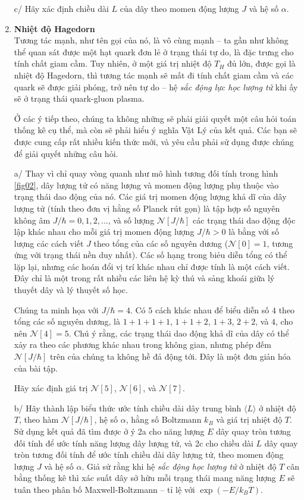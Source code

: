 \begin{enumerate}
    c/ Hãy xác định chiều dài $L$ của dây theo momen động lượng $J$ và hệ số $\alpha$. 
    
    \item \textbf{Nhiệt độ Hagedorn}\\
    Tương tác mạnh, như tên gọi của nó, là vô cùng mạnh -- ta gần như không thể quan sát được một hạt quark đơn lẻ ở trạng thái tự do, là đặc trưng cho tính chất giam cầm. Tuy nhiên, ở một giá trị nhiệt độ $T_{H}$ đủ lớn, được gọi là nhiệt độ Hagedorn, thì tương tác mạnh sẽ mất đi tính chất giam cầm và các quark sẽ được giải phóng, trở nên tự do -- hệ {\it sắc động lực học lượng tử} khi ấy sẽ ở trạng thái quark-gluon plasma.

    Ở các ý tiếp theo, chúng ta không những sẽ phải giải quyết một câu hỏi toán thống kê cụ thể, mà còn sẽ phải hiểu ý nghĩa Vật Lý của kết quả. Các bạn sẽ được cung cấp rất nhiều kiến thức mới, và yêu cầu phải sử dụng được chúng để giải quyết những câu hỏi.

    a/ Thay vì chỉ quay vòng quanh như mô hình tương đối tính trong hình \ref{fig02}, dây lượng tử có năng lượng và momen động lượng phụ thuộc vào trạng thái dao động của nó. Các giá trị momen động lượng khả dĩ của dây lượng tử (tính theo đơn vị hằng số Planck rút gọn) là tập hợp số nguyên không âm $J/\hbar =0,1,2,...$, và số lượng $\mathcal{N}[J/\hbar]$ các trạng thái dao động độc lập khác nhau cho mỗi giá trị momen động lượng $J/\hbar>0$ là bằng với số lượng các cách viết $J$ theo tổng của các số nguyên dương ($\mathcal{N}[0]=1$, tương ứng với trạng thái nền duy nhất). Các số hạng trong biẻu diễn tổng có thể lặp lại, nhưng các hoán đổi vị trí khác nhau chỉ được tính là một cách viết. Đây chỉ là một trong rất nhiều các liên hệ kỳ thú và sảng khoái giữa lý thuyết dây và lý thuyết số học.

    Chúng ta minh họa với $J/\hbar=4$. Có $5$ cách khác nhau để biểu diễn số $4$ theo tổng các số nguyên dương, là $1+1+1+1$, $1+1+2$, $1+3$, $2+2$, và $4$, cho nên $\mathcal{N}[4]=5$. Chú ý rằng, các trạng thái dao động khả dĩ của dây có thể xảy ra theo các phương khác nhau trong không gian, nhưng phép đếm $\mathcal{N}[J/\hbar]$ trên của chúng ta không hề đả động tới. Đây là một đơn giản hóa của bài tập. 

    Hãy xác định giá trị $\mathcal{N}[5]$, $\mathcal{N}[6]$, và $\mathcal{N}[7]$.

    b/ Hãy thành lập biểu thức ước tính chiều dài dây trung bình $\langle L \rangle$ ở nhiệt độ $T$, theo hàm $\mathcal{N}[J/\hbar]$, hệ số $\alpha$, hằng số Boltzmann $k_B$ và giá trị nhiệt độ $T$. Sử dụng kết quả đã tìm được ở ý 2a cho năng lượng $E$ dây quay tròn tương đối tính để ước tính năng lượng dây lượng tử, và 2c cho chiều dài $L$ dây quay tròn tương đối tính để ước tính chiều dài dây lượng tử, theo momen động lượng $J$ và hệ số $\alpha$. Giả sử rằng khi hệ {\it sắc động học lượng tử} ở nhiệt độ $T$ cân bằng thống kê thì xác suất dây sở hữu mỗi trạng thái mang năng lượng $E$ sẽ tuân theo phân bố Maxwell-Boltzmann -- tỉ lệ với $\exp(-E/k_B T)$.  


\end{enumerate}
